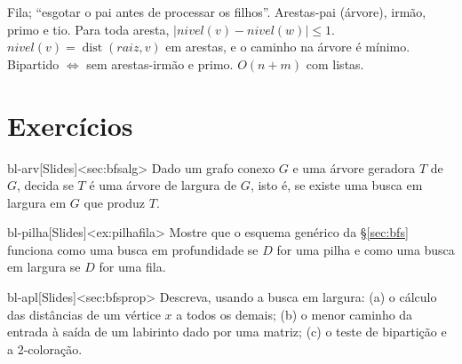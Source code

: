 \begin{chave}
Fila; ``esgotar o pai antes de processar os filhos''. Arestas-pai (árvore), irmão, primo e tio. Para toda aresta, $|nivel(v)-nivel(w)|\le1$. $nivel(v)=\operatorname{dist}(raiz,v)$ em arestas, e o caminho na árvore é mínimo. Bipartido $\iff$ sem arestas-irmão e primo. $O(n+m)$ com listas.
\end{chave}

\section{Exercícios}
\excurso
\begin{exercicio}{bl-arv}[Slides]<sec:bfsalg>
Dado um grafo conexo $G$ e uma árvore geradora $T$ de $G$, decida se $T$ é uma árvore de largura de $G$, isto é, se existe uma busca em largura em $G$ que produz $T$.
\end{exercicio}
\begin{exercicio}{bl-pilha}[Slides]<ex:pilhafila>
Mostre que o esquema genérico da §\ref{sec:bfs} funciona como uma busca em profundidade se $D$ for uma pilha e como uma busca em largura se $D$ for uma fila.
\end{exercicio}
\begin{exercicio}{bl-apl}[Slides]<sec:bfsprop>
Descreva, usando a busca em largura: (a) o cálculo das distâncias de um vértice $x$ a todos os demais; (b) o menor caminho da entrada à saída de um labirinto dado por uma matriz; (c) o teste de bipartição e a 2-coloração.
\end{exercicio}

